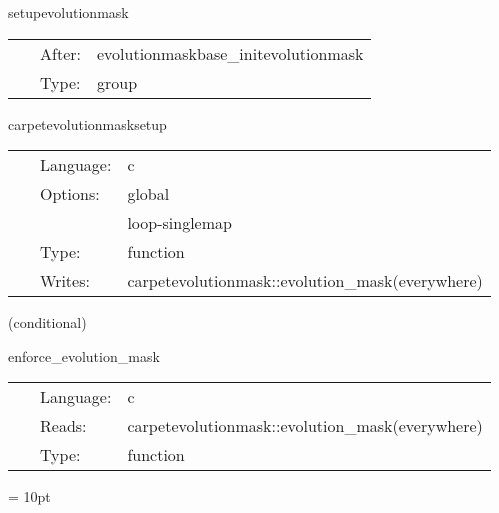 \hspace{5mm} setupevolutionmask 

\hspace{5mm}{\it set up the weight function (schedule other routines in here) } 


\hspace{5mm}

 \begin{tabular*}{160mm}{cll} 
~ & After:  & evolutionmaskbase\_initevolutionmask \\ 
~ & Type:  & group \\ 
\end{tabular*} 


\vspace{5mm}


\hspace{5mm} carpetevolutionmasksetup 

\hspace{5mm}{\it set up the mask function for the restriction regions } 


\hspace{5mm}

 \begin{tabular*}{160mm}{cll} 
~ & Language:  & c \\ 
~ & Options:  & global \\ 
~& ~ &loop-singlemap\\ 
~ & Type:  & function \\ 
~ & Writes:  & carpetevolutionmask::evolution\_mask(everywhere) \\ 
\end{tabular*} 


\vspace{5mm}

   (conditional) 

\hspace{5mm} enforce\_evolution\_mask 

\hspace{5mm}{\it enforce evolution mask } 


\hspace{5mm}

 \begin{tabular*}{160mm}{cll} 
~ & Language:  & c \\ 
~ & Reads:  & carpetevolutionmask::evolution\_mask(everywhere) \\ 
~ & Type:  & function \\ 
\end{tabular*} 



\vspace{5mm}\parskip = 10pt 
